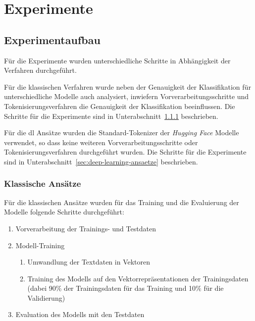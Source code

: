 \section{Experimente}

\subsection{Experimentaufbau}

Für die Experimente wurden unterschiedliche Schritte in Abhängigkeit der Verfahren durchgeführt.

Für die klassischen Verfahren wurde neben der Genauigkeit der Klassifikation für unterschiedliche Modelle auch analysiert, inwiefern Vorverarbeitungsschritte und Token\-isier\-ungs\-verfahren die Genauigkeit der Klassifikation beeinflussen.
Die Schritte für die Experimente sind in Unterabschnitt~\ref{sec:klassische-ansaetze} beschrieben.

Für die \gls{dl} Ansätze wurden die Standard-Tokenizer der \textit{Hugging Face} Modelle verwendet, so dass keine weiteren Vorverarbeitungsschritte oder Tokenisierungsverfahren durchgeführt wurden.
Die Schritte für die Experimente sind in Unterabschnitt~\ref{sec:deep-learning-ansaetze} beschrieben.

\subsubsection{Klassische Ansätze}\label{sec:klassische-ansaetze}

Für die klassischen Ansätze wurden für das Training und die Evaluierung der Modelle folgende Schritte durchgeführt:
\begin{enumerate}
    \item Vorverarbeitung der Trainings- und Testdaten
    \item Modell-Training
    \begin{enumerate}
        \item Umwandlung der Textdaten in Vektoren
        \item Training des Modells auf den Vektorrepräsentationen der Trainingsdaten (dabei 90\% der Trainingsdaten für das Training und 10\% für die Validierung)
    \end{enumerate}
    \item Evaluation des Modells mit den Testdaten
\end{enumerate}


